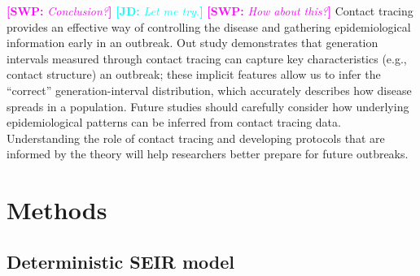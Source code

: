 \documentclass[12pt]{article}
\newcommand{\comment}[3]{\textcolor{#1}{\textbf{[#2: }\textsl{#3}\textbf{]}}}
\newcommand{\jd}[1]{\comment{cyan}{JD}{#1}}
\newcommand{\swp}[1]{\comment{magenta}{SWP}{#1}}
\begin{document}
\swp{Conclusion?}
\jd{Let me try.}
\swp{How about this?}
Contact tracing provides an effective way of controlling the disease and gathering epidemiological information early in an outbreak.
Out study demonstrates that generation intervals measured through contact tracing can capture key characteristics (e.g., contact structure) an outbreak; 
these implicit features allow us to infer the ``correct'' generation-interval distribution, which accurately describes how disease spreads in a population. 
Future studies should carefully consider how underlying epidemiological patterns can be inferred from contact tracing data.
Understanding the role of contact tracing and developing protocols that are informed by the theory will help researchers better prepare for future outbreaks.

\section{Methods}

\subsection{Deterministic SEIR model}
\end{document}
